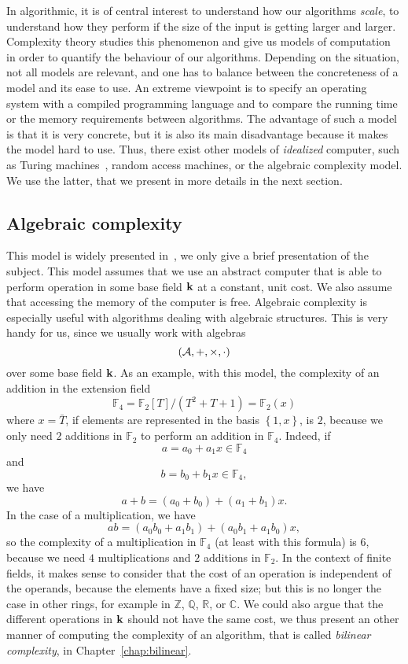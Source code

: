 In algorithmic, it is of central interest to understand how our algorithms
\emph{scale}, \ie to understand how they perform if the size of the input is
getting larger and larger. Complexity theory studies this phenomenon and give us models
of computation in order to quantify the behaviour of our algorithms. Depending
on the situation, not all models are relevant, and one has to balance between
the concreteness of a model and its ease to use. An extreme viewpoint is to
specify an operating system with a compiled programming language and to compare
the running time or the memory requirements between algorithms. The advantage of
such a model is that it is very concrete, but it is also its main disadvantage
because it makes the model hard to use. Thus, there exist other models of
\emph{idealized} computer, such as Turing machines~\cite{Papadimitriou03},
random access machines, or the algebraic complexity model.
We use the latter, that we present in more details in the next section.

\subsection{Algebraic complexity}

This model is widely presented in~\cite{BCS13}, we only give a brief
presentation of the subject. This model assumes that we use an abstract computer
that is able to perform operation in some base field $\mathbf{k}$ at a constant, unit
cost. We also assume that accessing the memory of the computer is free.
Algebraic complexity is especially useful with algorithms dealing with
algebraic structures. This is very handy for us, since
we usually work with algebras
\[
  (\mathcal{A}, +, \times, \cdot)
\]
over some base field $\mathbf{k}$. As an example, with this model, the complexity of an
addition in the extension field
\[
  \mathbb{F}_4 = \mathbb{F}_2[T]/(T^2+T+1) = \mathbb{F}_2(x)
\]
where $x=\bar T$, if elements are represented in the basis $\left\{ 1, x
\right\}$, is $2$, because we only need $2$ additions in $\mathbb{F}_2$ to
perform an addition in $\mathbb{F}_4$. Indeed, if
\[
  a = a_0 + a_1x\in\mathbb{F}_4
\]
and
\[
  b = b_0 + b_1x\in\mathbb{F}_4,
\]
we have
\[
  a+b = (a_0+b_0)+(a_1+b_1)x.
\]
In the case of a multiplication, we have
\[
  ab = (a_0b_0+a_1b_1) + (a_0b_1+a_1b_0)x,
\]
so the complexity of a multiplication in $\mathbb{F}_4$ (at least with this
formula) is $6$, because we need
$4$ multiplications and $2$ additions in $\mathbb{F}_2$. In the context of
finite fields, it makes sense to consider that the cost of an operation is
independent of the operands, because the elements have a fixed size; but this is
no longer the case in other rings, for example in $\mathbb{Z}$, $\mathbb{Q}$,
$\mathbb{R}$, or $\mathbb{C}$. We could also argue that the different operations
in $\mathbf{k}$ should not have the same cost, we thus present an other manner of
computing the complexity of an algorithm, that is called \emph{bilinear
complexity}, in Chapter~\ref{chap:bilinear}.

